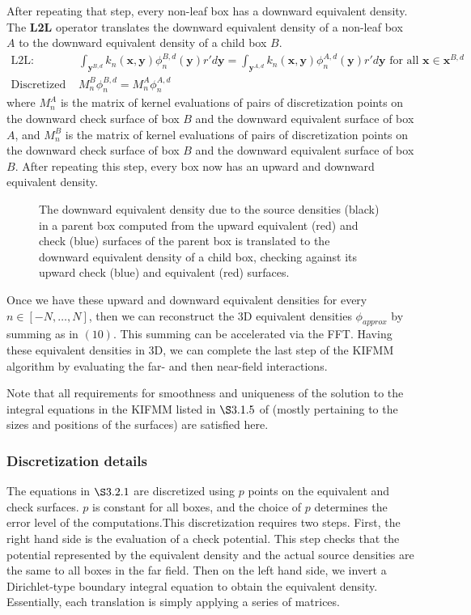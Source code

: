 \documentclass[11pt, oneside]{article}   	%
\begin{document}
After repeating that step, every non-leaf box has a downward equivalent density. The \textbf{L2L} operator translates the downward equivalent density of a non-leaf box $A$ to the downward equivalent density of a child box $B$.
\begin{align}
\mbox{L2L: }&\int_{\mathbf{y}^{B,d}}{k_n(\mathbf{x},\mathbf{y})}\phi^{B,d}_n{(\mathbf{y})}r'd\mathbf{y}=\int_{\mathbf{y}^{A,d}}{k_n(\mathbf{x},\mathbf{y})}\phi^{A,d}_n{(\mathbf{y})}r'd\mathbf{y}\mbox{ for all }\mathbf{x}\in\mathbf{x}^{B,d}\\
\mbox{Discretized L2L: }&M_n^B\phi^{B,d}_n=M_n^A\phi^{A,d}_n
\end{align}
where $M_n^A$ is the matrix of kernel evaluations of pairs of discretization points on the downward check surface of box $B$ and the downward equivalent surface of box $A$, and $M_n^B$ is the matrix of kernel evaluations of pairs of discretization points on the downward check surface of box $B$ and the downward equivalent surface of box $B$. After repeating this step, every box now has an upward and downward equivalent density.

\begin{figure}[!ht]
\begin{center}
\end{center}
\caption{The downward equivalent density due to the source densities (black) in a parent box computed from the upward equivalent (red) and check (blue) surfaces of the parent box is translated to the downward equivalent density of a child box, checking against its upward check (blue) and equivalent (red) surfaces.}
\end{figure}

Once we have these upward and downward equivalent densities for every $n\in[-N,\dots,N]$, then we can reconstruct the 3D equivalent densities $\phi_{approx}$ by summing as in $(10)$. This summing can be accelerated via the FFT. Having these equivalent densities in 3D, we can complete the last step of the KIFMM algorithm by evaluating the far- and then near-field interactions.

Note that all requirements for smoothness and uniqueness of the solution to the integral equations in the KIFMM listed in $\S3.1.5$ of \cite{YBZ} (mostly pertaining to the sizes and positions of the surfaces) are satisfied here.

\subsubsection{Discretization details}
The equations in $\S3.2.1$ are discretized using $p$ points on the equivalent and check surfaces. $p$ is constant for all boxes, and the choice of $p$ determines the error level of the computations.This discretization requires two steps. First, the right hand side is the evaluation of a check potential. This step checks that the potential represented by the equivalent density and the actual source densities are the same to all boxes in the far field. Then on the left hand side, we invert a Dirichlet-type boundary integral equation to obtain the equivalent density. Essentially, each translation is simply applying a series of matrices.
\end{document}

